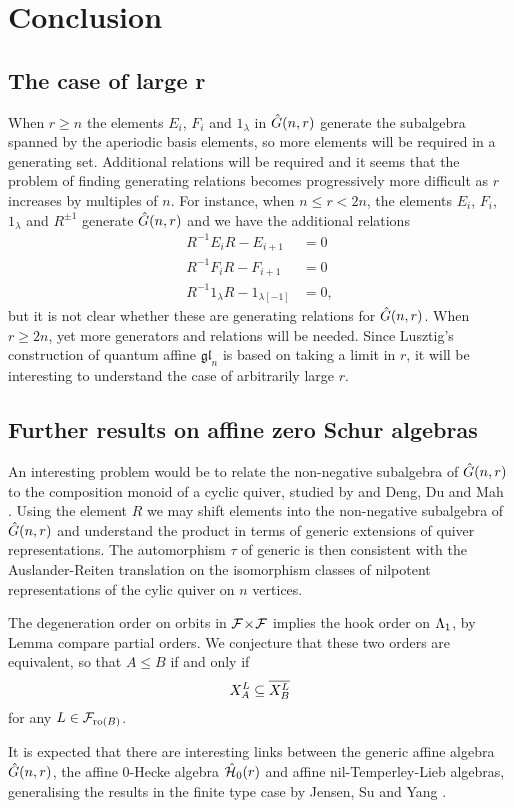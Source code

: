 \documentclass[a4paper, 11pt, twoside]{report}
\begin{document}
\chapter{Conclusion}\label{chapter:conclusion}

\section{The case of large r}

When $r\geq n$ the elements $E_i$, $F_i$ and $1_\lambda$ in $\generic$ generate the subalgebra spanned by the aperiodic basis elements, so more elements will be required in a generating set. Additional relations will be required and it seems that the problem of finding generating relations becomes progressively more difficult as $r$ increases by multiples of $n$. For instance, when $n\le r<2n$, the elements $E_i$, $F_i$, $1_\lambda$ and $R^{\pm 1}$ generate $\generic$ and we have the additional relations
\begin{align*}
R^{-1}E_i R - E_{i+1} &= 0\\
R^{-1}F_i R - F_{i+1} &= 0\\
R^{-1}1_\lambda R - 1_{\lambda[-1]} &= 0,
\end{align*} 
but it is not clear whether these are generating relations for $\generic$. When $r\geq 2n$, yet more generators and relations will be needed. Since Lusztig's construction of quantum affine $\mathfrak{gl}_n$ is based on taking a limit in $r$, it will be interesting to understand the case of arbitrarily large $r$.

\section{Further results on affine zero Schur algebras}

An interesting problem would be to relate the non-negative subalgebra of $\generic$ to the composition monoid of a cyclic quiver, studied by \cite{hubery04} and Deng, Du and Mah \cite{deng13}. Using the element $R$ we may shift elements into the non-negative subalgebra of $\generic$ and understand the product in terms of generic extensions of quiver representations. The automorphism $\tau$ of generic is then consistent with the Auslander-Reiten translation on the isomorphism classes of nilpotent representations of the cylic quiver on $n$ vertices.

The degeneration order on orbits in $\dblflags$ implies the hook order on $\matrices$, by Lemma compare partial orders. We conjecture that these two orders are equivalent, so that $A\le B$ if and only if
\begin{equation*}
\xprod[L]{A}\subset\overline{\xprod[L]{B}}
\end{equation*}
for any $L\in\flags_{\ro{B}}$.

It is expected that there are interesting links between the generic affine algebra $\generic$, the affine 0-Hecke algebra $\zerohecke$ and affine nil-Temperley-Lieb algebras, generalising the results in the finite type case by Jensen, Su and Yang \cite{su20}.

\nocite{*}
\printbibliography
\end{document}
